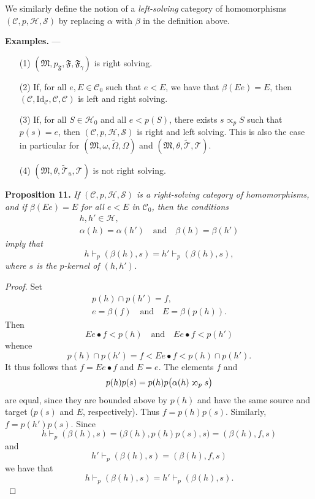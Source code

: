 \documentclass[a4paper,oneside,nobib,nofonts,notitlepage,notoc,nols,fleqn,justified]{tufte-book}
\newenvironment{itenv}[1]
  {\phantomsection\par\medskip\noindent\textbf{#1.}\itshape}
  {\par\medskip}
\newenvironment{rmenv}[1]
  {\phantomsection\par\medskip\noindent\textbf{#1.}\rmfamily}
  {\par\medskip}
\newcommand{\oldpage}[1]{{\reversemarginpar\marginnote{\raggedleft\footnotesize\textit{p.~#1}}}}
\newcommand{\CC}{\mathcal{C}}
\newcommand{\HH}{\mathcal{H}}
\renewcommand{\SS}{\mathcal{S}}
\newcommand{\MM}{\mathfrak{M}}
\newcommand{\FF}{\mathfrak{F}}
\newcommand{\TT}{\mathcal{T}}
\newcommand{\subs}{\mathrel{\propto}}
\newcommand{\sups}{\mathrel{\reflectbox{$\propto$}}}
\newcommand{\Id}{\mathrm{Id}}
\begin{document}
We similarly define the notion of a \emph{left-solving} category of homomorphisms $(\CC,p,\HH,\SS)$ by replacing $\alpha$ with $\beta$ in the definition above.

\begin{rmenv}{Examples}
  ---
  \begin{enumerate}
    \item [\normalfont(1)]
      $(\MM,p_\FF,\FF,\FF_\gamma)$ is right solving.

    \item [\normalfont(2)]
      If, for all $e,E\in\CC_0$ such that $e<E$, we have that $\beta(Ee)=E$, then $(\CC,\Id_\CC,\CC,\CC)$ is left and right solving.

    \item[\normalfont(3)]
      If, for all $S\in\HH_0$ and all $e<p(S)$, there exists $s\subs_p S$ such that $p(s)=e$, then $(\CC,p,\HH,\SS)$ is right and left solving.
      This is also the case in particular for $(\MM,\omega,\widetilde{\Omega},\Omega)$ and $(\MM,\theta,\widetilde{\TT},\TT)$.

    \item[\normalfont(4)]
      \oldpage{370}
      $(\MM,\theta,\widetilde{\TT}_u,\TT)$ is not right solving.
  \end{enumerate}
\end{rmenv}

\begin{itenv}{Proposition 11}
\label{proposition:11}
  If $(\CC,p,\HH,\SS)$ is a right-solving category of homomorphisms, and if $\beta(Ee)=E$ for all $e<E$ in $\CC_0$, then the conditions
  \[
    \begin{gathered}
      h,h'\in\HH,
    \\\alpha(h)=\alpha(h')
      \quad\text{and}\quad
      \beta(h)=\beta(h')
    \end{gathered}
  \]
  imply that
  \[
    h\vdash_p(\beta(h),s)
    = h'\vdash_p(\beta(h),s),
  \]
  where $s$ is the $p$-kernel of $(h,h')$.
\end{itenv}

\begin{proof}
  Set
  \[
    \begin{gathered}
      p(h)\cap p(h')=f,
    \\e=\beta(f)
      \quad\text{and}\quad
      E=\beta(p(h)).
    \end{gathered}
  \]
  Then
  \[
    Ee\bullet f<p(h)
    \quad\text{and}\quad
    Ee\bullet f<p(h')
  \]
  whence
  \[
    p(h)\cap p(h')
    = f
    < Ee\bullet f
    < p(h)\cap p(h').
  \]
  It thus follows that $f=Ee\bullet f$ and $E=e$.
  The elements $f$ and
  \[
    p(h)p(s)
    = p(h)p\big(
      \alpha(h)\sups_p s
    \big)
  \]
  are equal, since they are bounded above by $p(h)$ and have the same source and target ($p(s)$ and $E$, respectively).
  Thus $f=p(h)p(s)$.
  Similarly, $f=p(h')p(s)$.
  Since
  \[
    h\vdash_p(\beta(h),s)
    = \big(
      \beta(h), p(h)p(s), s
    \big)
    = (\beta(h),f,s)
  \]
  and
  \[
    h'\vdash_p(\beta(h),s)
    = (\beta(h),f,s)
  \]
  we have that
  \[
    h\vdash_p(\beta(h),s)
    = h'\vdash_p(\beta(h),s).
  \]
\end{proof}
\end{document}
